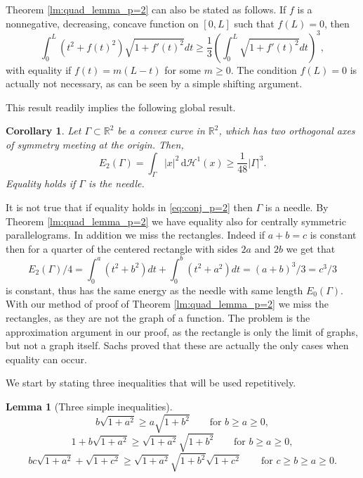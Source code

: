 \documentclass[10pt,leqno]{amsart}
\newcommand{\R}[0]{\mathbb{R}}
\newcommand{\dHo}{\, \mathrm{d} \mathcal{H}^{1}}
\numberwithin{Theorem}{section}
\newtheorem{Lemma}[Theorem]{Lemma}
\newtheorem{Corollary}[Theorem]{Corollary}
\theoremstyle{definition}
\theoremstyle{remark}
\numberwithin{equation}{section}
\numberwithin{equation}{section}
\begin{document}
Theorem \ref{lm:quad_lemma_p=2} can also be stated as follows. If $f$ is a nonnegative, decreasing, concave function on $[0,L]$ such that $f(L)=0$, then
\begin{equation}\label{eq:gy:quadrant lem p is 2 with f}
  \int_0^L (t^2+f(t)^2)\sqrt{1+f'(t)^2}dt
  \geq\frac{1}{3}\left(\int_0^L\sqrt{1+f'(t)^2}dt\right)^3,
\end{equation}
with equality if $f(t)=m(L-t)$ for some $m\geq 0.$ The condition $f(L)=0$ is actually not necessary, as can be seen by a simple shifting argument. 




This result readily implies the following global result.




\begin{Corollary} \label{thm:p=2}
Let $\Gamma \subset \R^2$ be a convex curve in $\R^2$, which has two orthogonal axes of symmetry meeting at the origin.  Then,
\begin{equation} \label{eq:conj_p=2}
{E_2(\Gamma)=}\int_{\Gamma} |x|^{2}  \dHo(x) \geq \frac{1}{48}|\Gamma|^{3}.
\end{equation}
Equality holds if $\Gamma$ is the \textit{needle}.
\end{Corollary}

It is not true that if equality holds in \eqref{eq:conj_p=2} then $\Gamma$ is a needle. By Theorem \ref{lm:quad_lemma_p=2} we have equality also for centrally symmetric parallelograms. In addition we miss the rectangles. Indeed  if $a+b=c$ is constant then for a quarter of the centered rectangle with sides $2a$ and $2b$ we get that
$$
  E_2(\Gamma)/4=\int_0^a (t^2+b^2)dt+\int_0^b(t^2+a^2)dt=(a+b)^3/3=c^3/3
$$
is constant, thus has the same energy as the needle with same length $E_0(\Gamma)$. With our method of proof of Theorem \ref{lm:quad_lemma_p=2} we miss the rectangles, as they are not the graph of a function. The problem is the approximation argument in our proof, as the rectangle is only the limit of graphs, but not a graph itself. 
Sachs \cite[2. Mitteilung, Satz 2]{SachsIandII} proved that these are actually the only cases when equality can occur.


We start by stating three inequalities that will be used repetitively. 

\begin{Lemma}[Three simple inequalities]
        \begin{equation}  \label{ineq2}
            b\sqrt{1+a^2} \geq a \sqrt{1+b^2} \qquad \text{for }b\geq a  \geq 0,
        \end{equation}
        \begin{equation}  \label{ineq3}
            1+b\sqrt{1+a^2} \geq \sqrt{1+a^2}\sqrt{1+b^2}\qquad \text{for }b\geq a  \geq 0,
        \end{equation}
        \begin{equation}  \label{ineq4}
           bc\sqrt{1+a^2} + \sqrt{1+c^2}\geq \sqrt{1+a^2}\sqrt{1+b^2}\sqrt{1+c^2} \qquad \text{for }c\geq b\geq a  \geq 0.
        \end{equation}

\end{Lemma}
\end{document}
